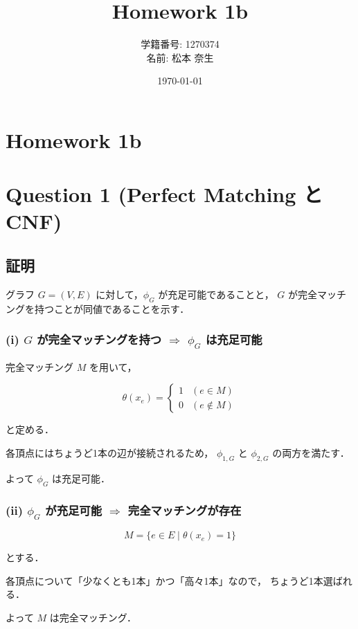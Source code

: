 \documentclass[uplatex,a4paper,11pt]{jsarticle}
\title{Homework 1b}
\author{学籍番号: 1270374 \\ 名前: 松本 奈生}
\date{\today}
\begin{document}
\maketitle


\section*{Homework 1b}

\section*{Question 1 (Perfect Matching と CNF)}

\subsection*{証明}

グラフ $G=(V,E)$ に対して，$\phi_G$ が充足可能であることと，
$G$ が完全マッチングを持つことが同値であることを示す．

\subsubsection*{(i) $G$ が完全マッチングを持つ $\Rightarrow$ $\phi_G$ は充足可能}

完全マッチング $M$ を用いて，

\[
\theta(x_e)=
\begin{cases}
1 & (e \in M)\\
0 & (e \notin M)
\end{cases}
\]

と定める．

各頂点にはちょうど1本の辺が接続されるため，
$\phi_{1,G}$ と $\phi_{2,G}$ の両方を満たす．

よって $\phi_G$ は充足可能．

\subsubsection*{(ii) $\phi_G$ が充足可能 $\Rightarrow$ 完全マッチングが存在}

\[
M = \{e \in E \mid \theta(x_e)=1\}
\]

とする．

各頂点について「少なくとも1本」かつ「高々1本」なので，
ちょうど1本選ばれる．

よって $M$ は完全マッチング．
\end{document}
